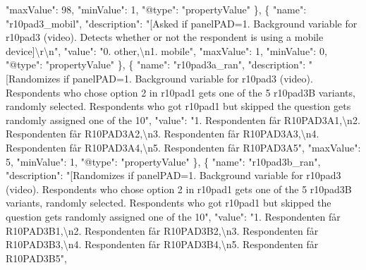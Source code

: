 \documentclass[
]{book}
\newenvironment{Shaded}{\begin{snugshade}}{\end{snugshade}}
\newcommand{\CharTok}[1]{\textcolor[rgb]{0.31,0.60,0.02}{#1}}
\newcommand{\DataTypeTok}[1]{\textcolor[rgb]{0.13,0.29,0.53}{#1}}
\newcommand{\DecValTok}[1]{\textcolor[rgb]{0.00,0.00,0.81}{#1}}
\newcommand{\FunctionTok}[1]{\textcolor[rgb]{0.00,0.00,0.00}{#1}}
\newcommand{\OtherTok}[1]{\textcolor[rgb]{0.56,0.35,0.01}{#1}}
\newcommand{\StringTok}[1]{\textcolor[rgb]{0.31,0.60,0.02}{#1}}
\begin{document}
\begin{Shaded}
\begin{Highlighting}[]
      \DataTypeTok{"maxValue"}\FunctionTok{:} \DecValTok{98}\FunctionTok{,}
      \DataTypeTok{"minValue"}\FunctionTok{:} \DecValTok{1}\FunctionTok{,}
      \DataTypeTok{"@type"}\FunctionTok{:} \StringTok{"propertyValue"}
    \FunctionTok{\}}\OtherTok{,}
    \FunctionTok{\{}
      \DataTypeTok{"name"}\FunctionTok{:} \StringTok{"r10pad3_mobil"}\FunctionTok{,}
      \DataTypeTok{"description"}\FunctionTok{:} \StringTok{"[Asked if panelPAD=1. Background variable for r10pad3 (video). Detects whether or not the respondent is using a mobile device]}\CharTok{\textbackslash{}r\textbackslash{}n}\StringTok{"}\FunctionTok{,}
      \DataTypeTok{"value"}\FunctionTok{:} \StringTok{"0. other,}\CharTok{\textbackslash{}n}\StringTok{1. mobile"}\FunctionTok{,}
      \DataTypeTok{"maxValue"}\FunctionTok{:} \DecValTok{1}\FunctionTok{,}
      \DataTypeTok{"minValue"}\FunctionTok{:} \DecValTok{0}\FunctionTok{,}
      \DataTypeTok{"@type"}\FunctionTok{:} \StringTok{"propertyValue"}
    \FunctionTok{\}}\OtherTok{,}
    \FunctionTok{\{}
      \DataTypeTok{"name"}\FunctionTok{:} \StringTok{"r10pad3a_ran"}\FunctionTok{,}
      \DataTypeTok{"description"}\FunctionTok{:} \StringTok{"[Randomizes if panelPAD=1. Background variable for r10pad3 (video). Respondents who chose option 2 in r10pad1 gets one of the 5 r10pad3B variants, randomly selected. Respondents who got r10pad1 but skipped the question gets randomly assigned one of the 10"}\FunctionTok{,}
      \DataTypeTok{"value"}\FunctionTok{:} \StringTok{"1. Respondenten får R10PAD3A1,}\CharTok{\textbackslash{}n}\StringTok{2. Respondenten får R10PAD3A2,}\CharTok{\textbackslash{}n}\StringTok{3. Respondenten får R10PAD3A3,}\CharTok{\textbackslash{}n}\StringTok{4. Respondenten får R10PAD3A4,}\CharTok{\textbackslash{}n}\StringTok{5. Respondenten får R10PAD3A5"}\FunctionTok{,}
      \DataTypeTok{"maxValue"}\FunctionTok{:} \DecValTok{5}\FunctionTok{,}
      \DataTypeTok{"minValue"}\FunctionTok{:} \DecValTok{1}\FunctionTok{,}
      \DataTypeTok{"@type"}\FunctionTok{:} \StringTok{"propertyValue"}
    \FunctionTok{\}}\OtherTok{,}
    \FunctionTok{\{}
      \DataTypeTok{"name"}\FunctionTok{:} \StringTok{"r10pad3b_ran"}\FunctionTok{,}
      \DataTypeTok{"description"}\FunctionTok{:} \StringTok{"[Randomizes if panelPAD=1. Background variable for r10pad3 (video). Respondents who chose option 2 in r10pad1 gets one of the 5 r10pad3B variants, randomly selected. Respondents who got r10pad1 but skipped the question gets randomly assigned one of the 10"}\FunctionTok{,}
      \DataTypeTok{"value"}\FunctionTok{:} \StringTok{"1. Respondenten får R10PAD3B1,}\CharTok{\textbackslash{}n}\StringTok{2. Respondenten får R10PAD3B2,}\CharTok{\textbackslash{}n}\StringTok{3. Respondenten får R10PAD3B3,}\CharTok{\textbackslash{}n}\StringTok{4. Respondenten får R10PAD3B4,}\CharTok{\textbackslash{}n}\StringTok{5. Respondenten får R10PAD3B5"}\FunctionTok{,}

\end{Highlighting}
\end{Shaded}
\end{document}

